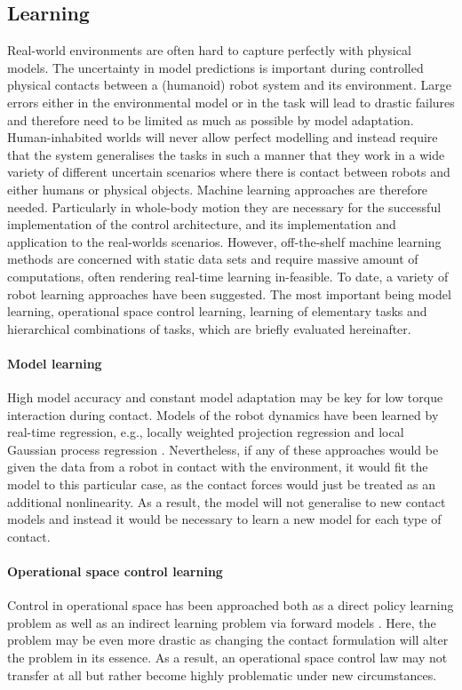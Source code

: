 \documentclass[final,5p,twocolumn]{elsarticle}
\begin{document}
\subsection{Learning}
Real-world environments are often hard to capture perfectly with physical models. The uncertainty in model predictions is important during controlled physical contacts between a (humanoid) robot system and its environment. Large errors either in the environmental model or in the task will lead to drastic failures and therefore need to be limited as much as possible by model adaptation. Human-inhabited worlds will never allow perfect modelling and instead require that the system generalises the tasks in such a manner that they work in a wide variety of different uncertain scenarios where there is contact between robots and either humans or physical objects. Machine learning approaches are therefore needed. Particularly in whole-body motion they are necessary for the successful implementation of the control architecture, and its implementation and application to the real-worlds scenarios. However, off-the-shelf machine learning methods are concerned with static data sets and require massive amount of computations, often rendering real-time learning in-feasible. To date, a variety of robot learning approaches have been suggested. The most important being model learning, operational space control learning, learning of elementary tasks and hierarchical combinations of tasks, which are briefly evaluated hereinafter.

\paragraph{Model learning}
 High model accuracy and constant model adaptation may be key for low torque interaction during contact. Models of the robot dynamics have been learned by real-time regression, e.g., locally weighted projection regression \cite{Schaal2002a} and local Gaussian process regression \cite{Nguyen-tuong2010a}. Nevertheless, if any of these approaches would be given the data from a robot in contact with the environment, it would fit the model to this particular case, as the contact forces would just be treated as an additional nonlinearity. As a result, the model will not generalise to new contact models and instead it would be necessary to learn a new model for each type of contact.

\paragraph{Operational space control learning}
Control in operational space has been approached both as a direct policy learning problem \cite{Peters2008a} as well as an indirect learning problem via forward models \cite{Salaun2010}. Here, the problem may be even more drastic as changing the contact formulation will alter the problem in its essence. As a result, an operational space control law may not transfer at all but rather become highly problematic under new circumstances. 
\end{document}
